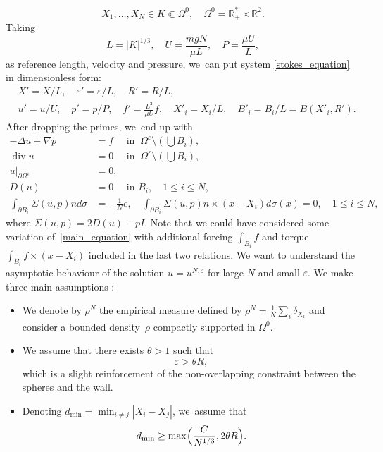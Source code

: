 \documentclass[10pt]{amsart}
\let\epsilon\varepsilon
\renewcommand{\div}{\operatorname{div}}
\theoremstyle{plain}
\theoremstyle{definition}
\let\pa\partial
\let\na\nabla
\let\eps\varepsilon
\newcommand{\R}{\mathbb{R}}
\begin{document}
\begin{equation} \label{eq_assumption}
X_1, \dots, X_N \in K \Subset \overline{\Omega^0}, \quad \Omega^0 = \R^*_+ \times \R^2.
\end{equation}
Taking
\[
L = |K|^{1/3}, \quad U = \frac{mgN}{\mu L}, \quad P = \frac{\mu U}{L},
\]
as reference length, velocity and pressure, we~can put system \eqref{stokes_equation} in dimensionless form:
\begin{align*}
& X' = X/L, \quad \eps' = \eps/L, \quad R'= R/L, \\
& u' = u/U, \quad p' = p/P, \quad f' = \frac{L^2}{\mu U} f, \quad X'_i = X_i/L, \quad B'_i = B_i/L = B(X'_i, R').
\end{align*}
After dropping the primes, we~end up with
\begin{equation} \label{main_equation}
\begin{aligned}
-\Delta u + \na p & = f \quad \text{ in } \: \Omega^\eps \setminus(\bigcup B_i), \\
\div u & = 0 \quad \text{ in } \: \Omega ^\eps\setminus(\bigcup B_i), \\
u\vert_{\pa \Omega^\eps} & = 0, \\
D(u) & = 0 \quad \text{ in } B_i, \quad 1 \le i \le N, \\
\int_{\pa B_i} \Sigma(u,p) n d \sigma & = -\frac{1}{N}e, \quad \int_{\pa B_i} \Sigma(u,p) n \times (x-X_i) d \sigma(x)= 0, \quad 1 \le i \le N,
\end{aligned}
\end{equation}
where $\Sigma(u,p) = 2D(u) - p I$. Note that we could have considered some variation of~\eqref{main_equation} with additional forcing $\int_{B_i} f$ and torque $\int_{B_i} f \times (x-X_i)$ included in the last two relations.
We want to understand the asymptotic behaviour of the solution $u = u^{N,\eps}$ for large $N$ and small $\eps$. We make three main assumptions :
\begin{itemize}
\item We denote by $\rho^N$ the empirical measure defined by
$
\rho^N = \frac{1}{N} \sum_i \delta_{X_i}
$
and consider a bounded density~$\rho$ compactly supported in $\overline{\Omega^0}$.
\item We assume that there exists $\theta>1$ such that
\begin{equation} \label{H1}
\epsilon> \theta R,
\end{equation}
which is a slight reinforcement of the non-overlapping constraint between the spheres and the wall.
\item Denoting $d_{\min} = \min_{i \neq j} |X_i - X_j|$, we~assume that
\begin{equation}\label{hyp_dmin}
d_{\min}\geq \max\Bigl (\frac{C}{N^{1/3}},2\theta R \Bigr).
\end{equation}
\end{itemize}
\end{document}
